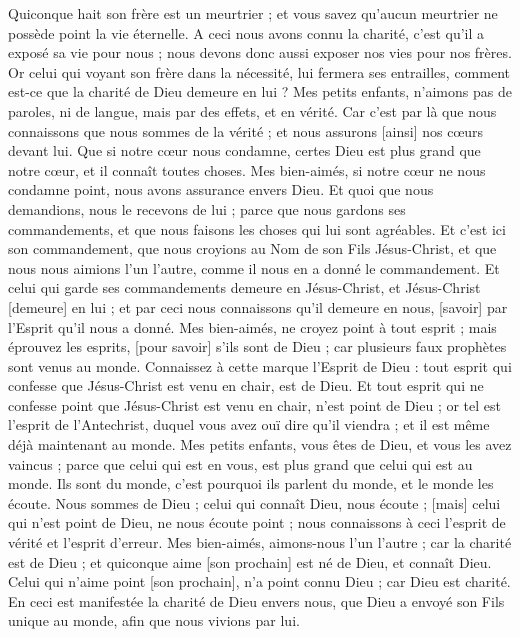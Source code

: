 \begin{multicols}{2}
Quiconque hait son frère est un meurtrier ; et vous savez qu'aucun meurtrier ne possède point la vie éternelle.
A ceci nous avons connu la charité, c'est qu'il a exposé sa vie pour nous ; nous devons donc aussi exposer nos vies pour nos frères.
Or celui qui voyant son frère dans la nécessité, lui fermera ses entrailles, comment est-ce que la charité de Dieu demeure en lui ?
Mes petits enfants, n'aimons pas de paroles, ni de langue, mais par des effets, et en vérité.
Car c'est par là que nous connaissons que nous sommes de la vérité ; et nous assurons [ainsi] nos cœurs devant lui.
Que si notre cœur nous condamne, certes Dieu est plus grand que notre cœur, et il connaît toutes choses.
Mes bien-aimés, si notre cœur ne nous condamne point, nous avons assurance envers Dieu.
Et quoi que nous demandions, nous le recevons de lui ; parce que nous gardons ses commandements, et que nous faisons les choses qui lui sont agréables.
Et c'est ici son commandement, que nous croyions au Nom de son Fils Jésus-Christ, et que nous nous aimions l'un l'autre, comme il nous en a donné le commandement.
Et celui qui garde ses commandements demeure en Jésus-Christ, et Jésus-Christ [demeure] en lui ; et par ceci nous connaissons qu'il demeure en nous, [savoir] par l'Esprit qu'il nous a donné.
\VerseOne{}Mes bien-aimés, ne croyez point à tout esprit ; mais éprouvez les esprits, [pour savoir] s'ils sont de Dieu ; car plusieurs faux prophètes sont venus au monde.
Connaissez à cette marque l'Esprit de Dieu : tout esprit qui confesse que Jésus-Christ est venu en chair, est de Dieu.
Et tout esprit qui ne confesse point que Jésus-Christ est venu en chair, n'est point de Dieu ; or tel est l'esprit de l'Antechrist, duquel vous avez ouï dire qu'il viendra ; et il est même déjà maintenant au monde.
Mes petits enfants, vous êtes de Dieu, et vous les avez vaincus ; parce que celui qui est en vous, est plus grand que celui qui est au monde.
Ils sont du monde, c'est pourquoi ils parlent du monde, et le monde les écoute.
Nous sommes de Dieu ; celui qui connaît Dieu, nous écoute ; [mais] celui qui n'est point de Dieu, ne nous écoute point ; nous connaissons à ceci l'esprit de vérité et l'esprit d'erreur.
Mes bien-aimés, aimons-nous l'un l'autre ; car la charité est de Dieu ; et quiconque aime [son prochain] est né de Dieu, et connaît Dieu.
Celui qui n'aime point [son prochain], n'a point connu Dieu ; car Dieu est charité.
En ceci est manifestée la charité de Dieu envers nous, que Dieu a envoyé son Fils unique au monde, afin que nous vivions par lui.

\end{multicols}
